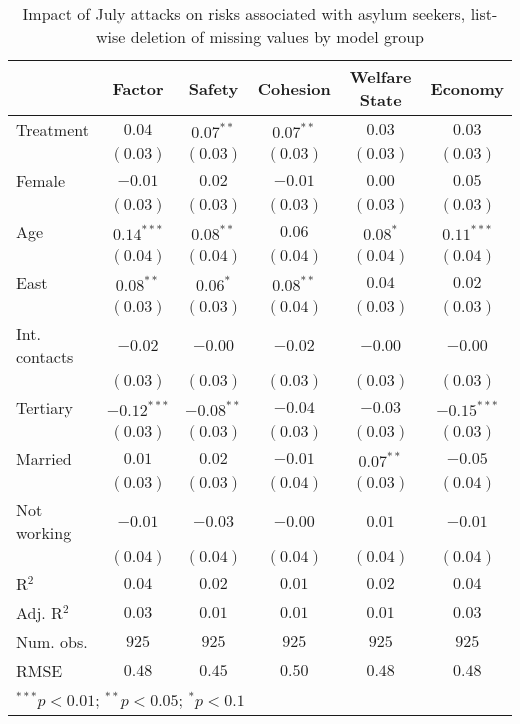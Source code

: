 
\begin{table}
\caption{Impact of July attacks on risks associated with asylum seekers, list-wise deletion of missing values by model group}
\begin{center}
\begin{tabular}{l c c c c c}
\toprule
 & Factor & Safety & Cohesion & Welfare State & Economy \\
\midrule
Treatment     & $0.04$        & $0.07^{**}$  & $0.07^{**}$ & $0.03$      & $0.03$        \\
              & $(0.03)$      & $(0.03)$     & $(0.03)$    & $(0.03)$    & $(0.03)$      \\
Female        & $-0.01$       & $0.02$       & $-0.01$     & $0.00$      & $0.05$        \\
              & $(0.03)$      & $(0.03)$     & $(0.03)$    & $(0.03)$    & $(0.03)$      \\
Age           & $0.14^{***}$  & $0.08^{**}$  & $0.06$      & $0.08^{*}$  & $0.11^{***}$  \\
              & $(0.04)$      & $(0.04)$     & $(0.04)$    & $(0.04)$    & $(0.04)$      \\
East          & $0.08^{**}$   & $0.06^{*}$   & $0.08^{**}$ & $0.04$      & $0.02$        \\
              & $(0.03)$      & $(0.03)$     & $(0.04)$    & $(0.03)$    & $(0.03)$      \\
Int. contacts & $-0.02$       & $-0.00$      & $-0.02$     & $-0.00$     & $-0.00$       \\
              & $(0.03)$      & $(0.03)$     & $(0.03)$    & $(0.03)$    & $(0.03)$      \\
Tertiary      & $-0.12^{***}$ & $-0.08^{**}$ & $-0.04$     & $-0.03$     & $-0.15^{***}$ \\
              & $(0.03)$      & $(0.03)$     & $(0.03)$    & $(0.03)$    & $(0.03)$      \\
Married       & $0.01$        & $0.02$       & $-0.01$     & $0.07^{**}$ & $-0.05$       \\
              & $(0.03)$      & $(0.03)$     & $(0.04)$    & $(0.03)$    & $(0.04)$      \\
Not working   & $-0.01$       & $-0.03$      & $-0.00$     & $0.01$      & $-0.01$       \\
              & $(0.04)$      & $(0.04)$     & $(0.04)$    & $(0.04)$    & $(0.04)$      \\
\midrule
R$^2$         & $0.04$        & $0.02$       & $0.01$      & $0.02$      & $0.04$        \\
Adj. R$^2$    & $0.03$        & $0.01$       & $0.01$      & $0.01$      & $0.03$        \\
Num. obs.     & $925$         & $925$        & $925$       & $925$       & $925$         \\
RMSE          & $0.48$        & $0.45$       & $0.50$      & $0.48$      & $0.48$        \\
\bottomrule
\multicolumn{6}{l}{\scriptsize{$^{***}p<0.01$; $^{**}p<0.05$; $^{*}p<0.1$}}
\end{tabular}
\label{tab_risk_na_group}
\end{center}
\end{table}
